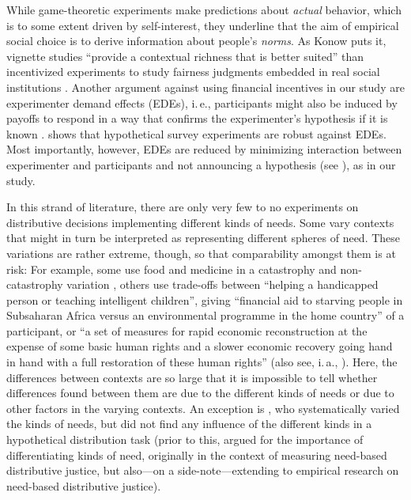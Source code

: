\documentclass[10pt,letterpaper]{article}
\begin{document}
While game-theoretic experiments make predictions about \textit{actual} behavior, which is to some extent driven by self-interest, they underline that the aim of empirical social choice is to derive information about people's \textit{norms}.
As Konow puts it, vignette studies ``provide a contextual richness that is better suited'' than incentivized experiments to study fairness judgments embedded in real social institutions \cite[p. 109]{konow_is_2009}.
Another argument against using financial incentives in our study are experimenter demand effects (EDEs), i.\,e., participants might also be induced by payoffs to respond in a way that confirms the experimenter's hypothesis if it is known \cite{zizzo_experimenter_2010}.
\cite{mummolo_demand_2019} shows that hypothetical survey experiments are robust against EDEs.
Most importantly, however, EDEs are reduced by minimizing interaction between experimenter and participants and not announcing a hypothesis (see \cite{de_quidt_measuring_2018}), as in our study.

In this strand of literature, there are only very few to no experiments on distributive decisions implementing different kinds of needs.
Some vary contexts that might in turn be interpreted as representing different spheres of need.
These variations are rather extreme, though, so that comparability amongst them is at risk: For example, some use food and medicine in a catastrophy and non-catastrophy variation \cite{scott_whats_2009}, others use trade-offs between ``helping a handicapped person or teaching intelligent children'', giving ``financial aid to starving people in Subsaharan Africa versus an environmental programme in the home country'' of a participant, or ``a set of measures for rapid economic reconstruction at the expense of some basic human rights and a slower economic recovery going hand in hand with a full restoration of these human rights'' \cite[p. 630]{gaertner_equity_2007} (also see, i.\,a., \cite{konow_fair_2001,konow_which_2003,gaertner_equity_2007,schwettmann_trading_2009}).
Here, the differences between contexts are so large that it is impossible to tell whether differences found between them are due to the different kinds of needs or due to other factors in the varying contexts.
An exception is \cite{bauer_needs_forthcoming}, who systematically varied the kinds of needs, but did not find any influence of the different kinds in a hypothetical distribution task (prior to this, \cite{bauer_sated_2018,bauer_sated_2022} argued for the importance of differentiating kinds of need, originally in the context of measuring need-based distributive justice, but also---on a side-note---extending to empirical research on need-based distributive justice).
\end{document}
